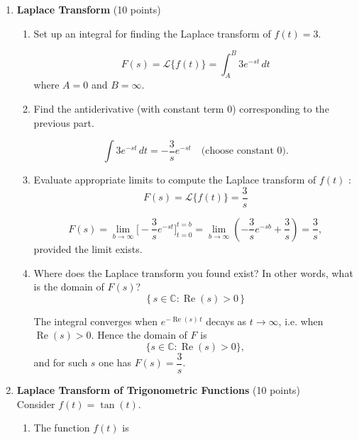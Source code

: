 \newpage
\begin{enumerate}


  \item \textbf{Laplace Transform} (10 points)\\
  \begin{enumerate}[label=(\alph*)]
    \item Set up an integral for finding the Laplace transform of $f(t)=3$.
    \begin{subanswer}
      $$
      F(s)=\mathcal{L}\{f(t)\}=\int_{A}^{B} 3e^{-st}\,dt
      $$
      where $A=\displaystyle 0$ and $B=\displaystyle \infty$.
    \end{subanswer}

    \item Find the antiderivative (with constant term $0$) corresponding to the previous part.
    \begin{subanswer}
      \[
        \int 3e^{-st}\,dt = -\frac{3}{s}e^{-st} \quad\text{(choose constant }0\text{).}
      \]
    \end{subanswer}
    \item Evaluate appropriate limits to compute the Laplace transform of $f(t)$ :
    $$
    F(s)=\mathcal{L}\{f(t)\}=\frac{3}{s}
    $$
    \begin{subanswer}
      \[
        F(s)=\lim_{b\to\infty}\Big[-\frac{3}{s}e^{-st}\Big]_{t=0}^{t=b}
        =\lim_{b\to\infty}\left(-\frac{3}{s}e^{-sb}+\frac{3}{s}\right)
        =\frac{3}{s},
      \]
      provided the limit exists.
    \end{subanswer}
    \item Where does the Laplace transform you found exist? In other words, what is the domain of $F(s)$?
    \[
      \{\,s\in\mathbb{C}:\operatorname{Re}(s)>0\,\}
    \]
    \begin{subanswer}
      The integral converges when $e^{-\operatorname{Re}(s)\,t}$ decays as $t\to\infty$, i.e. when $\operatorname{Re}(s)>0$. Hence the domain of $F$ is
      \[
        \{s\in\mathbb{C}:\operatorname{Re}(s)>0\},
      \]
      and for such $s$ one has $F(s)=\dfrac{3}{s}$.
    \end{subanswer}
  \end{enumerate}
  \newpage
  \item \textbf{Laplace Transform of Trigonometric Functions} (10 points)\\
  Consider $f(t)=\tan (t)$.
  \begin{enumerate}[label=(\alph*)]
    \item The function $f(t)$ is

\end{enumerate}
\end{enumerate}
